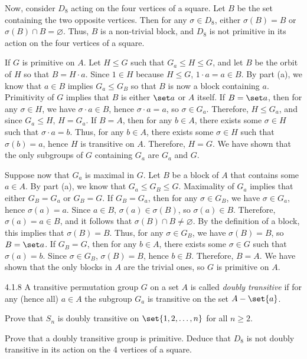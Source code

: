 \begin{solenum}[spsol]
	Now, consider $D_8$ acting on the four vertices of a square.
	Let $B$ be the set containing the two opposite vertices.
	Then for any $\sigma \in D_8$, either $\sigma(B) = B$ or $\sigma(B) \cap B = \varnothing$.
	Thus, $B$ is a non-trivial block, and $D_8$ is not primitive in its action on the four vertices of a square.
	\item \rightimp If $G$ is primitive on $A$.
	Let $H \leq G$ such that $G_a \leq H \leq G$, and let $B$ be the orbit of $H$ so that $B = H \cdot a$.
	Since $1 \in H$ because $H \leq G$, $1 \cdot a = a \in B$.
	By part (a), we know that $a \in B$ implies $G_a \leq G_B$ so that $B$ is now a block containing $a$.
	Primitivity of $G$ implies that $B$ is either $\set a$ or $A$ itself.
	If $B = \set a$, then for any $\sigma \in H$, we have $\sigma \cdot a \in B$, hence $\sigma \cdot a = a$, so $\sigma \in G_a$.
	Therefore, $H \leq G_a$, and since $G_a \leq H$, $H = G_a$.
	If $B = A$, then for any $b \in A$, there exists some $\sigma \in H$ such that $\sigma \cdot a = b$.
	Thus, for any $b \in A$, there exists some $\sigma \in H$ such that $\sigma(b) = a$, hence $H$ is transitive on $A$.
	Therefore, $H = G$.
	We have shown that the only subgroups of $G$ containing $G_a$ are $G_a$ and $G$.
	
	\leftimp Suppose now that $G_a$ is maximal in $G$.
	Let $B$ be a block of $A$ that contains some $a \in A$.
	By part (a), we know that $G_a \leq G_B \leq G$.
	Maximality of $G_a$ implies that either $G_B = G_a$ or $G_B = G$.
	If $G_B = G_a$, then for any $\sigma \in G_B$, we have $\sigma \in G_a$, hence $\sigma(a) = a$.
	Since $a \in B$, $\sigma(a) \in \sigma(B)$, so $\sigma(a) \in B$.
	Therefore, $\sigma(a) = a \in B$, and it follows that $\sigma(B) \cap B \neq \varnothing$.
	By the definition of a block, this implies that $\sigma(B) = B$.
	Thus, for any $\sigma \in G_B$, we have $\sigma(B) = B$, so $B = \set a$.
	If $G_B = G$, then for any $b \in A$, there exists some $\sigma \in G$ such that $\sigma(a) = b$.
	Since $\sigma \in G_B$, $\sigma(B) = B$, hence $b \in B$.
	Therefore, $B = A$.
	We have shown that the only blocks in $A$ are the trivial ones, so $G$ is primitive on $A$.
\end{solenum}

\begin{exercise}{4.1.8}
	A transitive permutation group $G$ on a set $A$ is called \emph{doubly transitive} if for any (hence all) $a \in A$ the subgroup $G_a$ is transitive on the set $A - \set{a}$.
	\begin{subexercises}
		\item Prove that $S_n$ is doubly transitive on $\set{1,2,\ldots,n}$ for all $n \ge 2$.
		\item Prove that a doubly transitive group is primitive.
		Deduce that $D_8$ is not doubly transitive in its action on the 4 vertices of a square.
	\end{subexercises}
\end{exercise}

